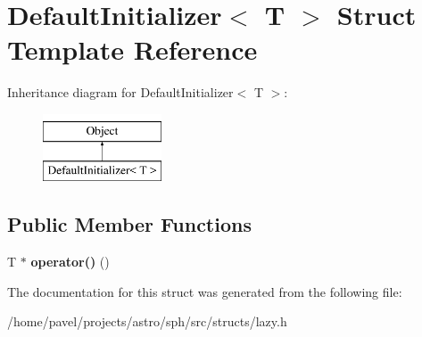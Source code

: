 \hypertarget{structDefaultInitializer}{}\section{Default\+Initializer$<$ T $>$ Struct Template Reference}
\label{structDefaultInitializer}
Inheritance diagram for Default\+Initializer$<$ T $>$\+:\begin{figure}[H]
\begin{center}
\leavevmode
\includegraphics[height=2.000000cm]{structDefaultInitializer}
\end{center}
\end{figure}
\subsection*{Public Member Functions}
\begin{DoxyCompactItemize}
\item 
\hypertarget{structDefaultInitializer_ae3bd0bc80ff8bbb05bf9cf31be37a83c}{}\label{structDefaultInitializer_ae3bd0bc80ff8bbb05bf9cf31be37a83c} 
T $\ast$ {\bfseries operator()} ()
\end{DoxyCompactItemize}


The documentation for this struct was generated from the following file\+:\begin{DoxyCompactItemize}
\item 
/home/pavel/projects/astro/sph/src/structs/lazy.\+h\end{DoxyCompactItemize}

